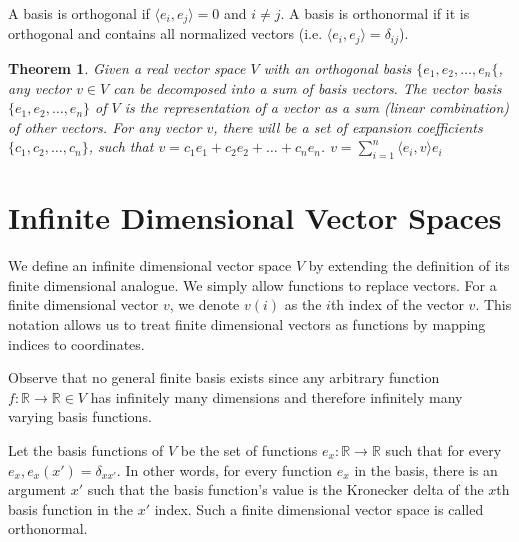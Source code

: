 \documentclass[11pt]{article} %
\newtheorem{theorem}{Theorem}[section]
\newenvironment{definition}[1][Definition]{\begin{trivlist}
\item[\hskip \labelsep {\bfseries #1}]}{\end{trivlist}}
\newenvironment{remark}[1][Remark]{\begin{trivlist}
\item[\hskip \labelsep {\bfseries #1}]}{\end{trivlist}}
\begin{document}
\begin{definition}
	A basis is orthogonal if $\langle e_i, e_j \rangle = 0 $ and $i \neq j$. A basis is orthonormal if it is orthogonal and contains all normalized vectors (i.e. $\langle e_i, e_j \rangle = \delta_{ij}$). 
\end{definition}


\begin{theorem}
	Given a real vector space $V$ with an orthogonal basis $\lbrace e_1, e_2, \ldots, e_n \lbrace$, any vector $v \in V$ can be decomposed into a sum of basis vectors. The vector basis $\lbrace e_1, e_2, \ldots, e_n \rbrace$ of $V$ is the representation of a vector as a sum (linear combination) of other vectors. For any vector $v$, there will be a set of expansion coefficients $\lbrace c_1, c_2, \ldots, c_n \rbrace$, such that $v = c_1e_1 + c_2e_2 + \ldots + c_ne_n$.  
	{\center
		$v = \sum_{i = 1}^{n}{\langle e_i, v \rangle e_i }$ \\
	}
\end{theorem}

\section{Infinite Dimensional Vector Spaces}

\begin{definition}
	We define an infinite dimensional vector space $V$ by extending the definition of its finite dimensional analogue. We simply allow functions to replace vectors. For a finite dimensional vector $v$, we denote $v(i)$ as the $i$th index of the vector $v$. This notation allows us to treat finite dimensional vectors as functions by mapping indices to coordinates. 
\end{definition}

\begin{remark}
	Observe that no general finite basis exists since any arbitrary function $f \colon \mathbb{R} \to \mathbb{R} \in V$ has infinitely many dimensions and therefore infinitely many varying basis functions. 
\end{remark}

\begin{definition}
	Let the basis functions of $V$ be the set of functions $e_x \colon \mathbb{R} \to \mathbb{R}$ such that for every $e_x, e_x(x') = \delta_{xx'}$. In other words, for every function $e_x$ in the basis, there is an argument $x'$ such that the basis function's value is the Kronecker delta of the $x$th basis function in the $x'$ index. Such a finite dimensional vector space is called orthonormal. 
\end{definition}
\end{document}
